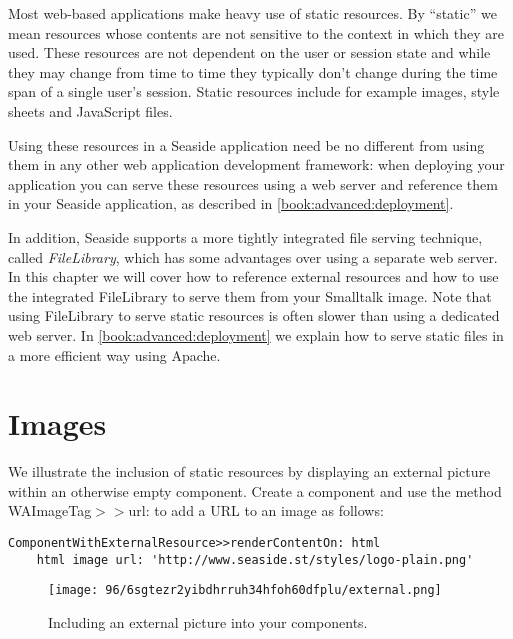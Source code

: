 \documentclass[a4paper,10pt,twoside]{book}
\newcommand{\ct}[1]{{\small\ttfamily\textup{#1}}}
\begin{document}
Most web-based applications make heavy use of static resources. By ``static'' we mean resources whose contents are not sensitive to the context in which they are used. These resources are not dependent on the user or session state and while they may change from time to time they typically don't change during the time span of a single user's session. Static resources include for example images, style sheets and JavaScript files. 

Using these resources in a Seaside application need be no different from using them in any other web application development framework: when deploying your application you can serve these resources using a web server and reference them in your Seaside application, as described in \autoref{book:advanced:deployment}. 

In addition, Seaside supports a more tightly integrated file serving technique, called \textit{FileLibrary}, which has some advantages over using a separate web server. In this chapter we will cover how to reference external resources and how to use the integrated FileLibrary to serve them from your Smalltalk image. Note that using FileLibrary to serve static resources is often slower than using a dedicated web server. In \autoref{book:advanced:deployment} we explain how to serve static files in a more efficient way using Apache.

\section{Images}
\label{book:inaction:servingfiles:images}

We illustrate the inclusion of static resources by displaying an external picture within an otherwise empty component. Create
a component and use the method  \ct{WAImageTag$>$$>$url:} to add a URL to an image as follows:

\begin{lstlisting}
ComponentWithExternalResource>>renderContentOn: html
    html image url: 'http://www.seaside.st/styles/logo-plain.png'
\end{lstlisting}

\begin{figure}[h!tbp]
	\begin{center}
		\texttt{[image: 96/6sgtezr2yibdhrruh34hfoh60dfplu/external.png]}
		\caption{Including an external picture into your components.\label{book:inaction:servingfiles:images:externalresource}}
	\end{center}
\end{figure}
\end{document}
